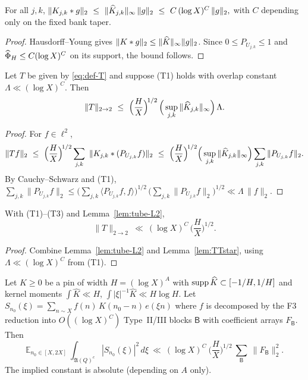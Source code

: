 \begin{lemma}\label{lem:tube-L2}
For all $j,k$,
\(
\|K_{j,k}\ast g\|_{2}\ \le\ \|\widehat K_{j,k}\|_{\infty}\,\|g\|_2
\ \le\ C\,(\log X)^{C}\,\|g\|_2,
\)
with $C$ depending only on the fixed bank taper.
\end{lemma}

\begin{proof}
Hausdorff–Young gives $\|K\ast g\|_2\le \|\widehat K\|_\infty\|g\|_2$. Since $0\le P_{U_{j,k}}\le 1$ and
$\widehat\Phi_H\le C(\log X)^C$ on its support, the bound follows.
\end{proof}

\begin{lemma}\label{lem:TTstar}
Let $T$ be given by \eqref{eq:def-T} and suppose (T1) holds with overlap constant $\Lambda\ll(\log X)^C$.
Then
\[
\|T\|_{2\to 2}\ \le\ \Big(\frac{H}{X}\Big)^{\!1/2}\, \Big(\sup_{j,k}\|\wh K_{j,k}\|_\infty\Big)\,\Lambda.
\]
\end{lemma}

\begin{proof}
For $f\in\ell^2$,
\[
\|Tf\|_2
\ \le\ \Big(\frac{H}{X}\Big)^{\!1/2}\sum_{j,k}\ \|K_{j,k}\ast (P_{U_{j,k}}f)\|_2
\ \le\ \Big(\frac{H}{X}\Big)^{\!1/2} \Big(\sup_{j,k}\|\widehat K_{j,k}\|_\infty\Big)\sum_{j,k}\|P_{U_{j,k}}f\|_2.
\]
By Cauchy–Schwarz and (T1),
\(
\sum_{j,k}\|P_{U_{j,k}}f\|_2
\le \big(\sum_{j,k}\langle P_{U_{j,k}}f,f\rangle\big)^{1/2}\, \big(\sum_{j,k}\|P_{U_{j,k}}f\|_2\big)^{1/2}
\ll \Lambda\,\|f\|_2.
\)
\end{proof}

\begin{proposition}\label{prop:ssu-ttstar}
With (T1)–(T3) and Lemma~\ref{lem:tube-L2},
\[
\|T\|_{2\to2}\ \ll\ (\log X)^C\,\Big(\frac{H}{X}\Big)^{\!1/2}.
\]
\end{proposition}

\begin{proof}
Combine Lemma~\ref{lem:tube-L2} and Lemma~\ref{lem:TTstar}, using $\Lambda\ll(\log X)^C$ from (T1).
\end{proof}

\begin{theorem}\label{thm:SSU-sqrt}
Let $K\ge 0$ be a pin of width $H=(\log X)^A$ with $\operatorname{supp}\widehat K\subset[-1/H,1/H]$ and kernel moments $\int \widehat K\ll H$, $\int |\xi|^{-1}\widehat K\ll H\log H$. 
Let $S_{n_0}(\xi)=\sum_{n\sim X} f(n)\,K(n_0-n)\,e(\xi n)$ where $f$ is decomposed by the F3 reduction into $O((\log X)^C)$ Type~II/III blocks $\mathsf B$ with coefficient arrays $F_{\mathsf B}$.
Then
\[
\mathbb E_{n_0\in[X,2X]}\ \int_{\mathfrak A(Q)^c}\! |S_{n_0}(\xi)|^2\,d\xi
\ \ll\ (\log X)^C\ \Big(\frac{H}{X}\Big)^{1/2}\ \sum_{\mathsf B}\ \|F_{\mathsf B}\|_2^2.
\]
The implied constant is absolute (depending on $A$ only). 
\end{theorem}

